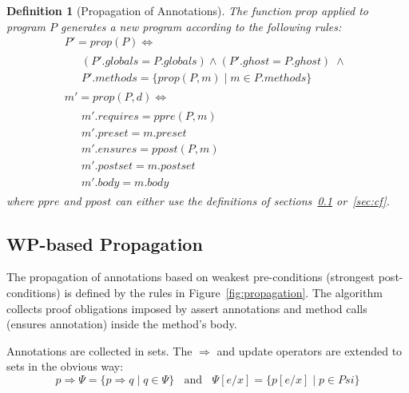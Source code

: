 \documentclass[10pt,notitlepage,twoside]{article}
\newcommand{\ppre}{\mathit{ppre}}
\newcommand{\ppost}{\mathit{ppost}}
\newtheorem{definition}{Definition}
\begin{document}
\begin{definition}[Propagation of Annotations]
The function $\mathit{prop}$ applied to program $P$ generates a new program  according to the following rules:
\begin{displaymath}
\begin{array}{l}
P' = \mathit{prop}(P) \Leftrightarrow \\
\;\;\;\;
\begin{array}{l}
(P'.\mathit{globals} = P.\mathit{globals}) \wedge (P'.\mathit{ghost} = P.\mathit{ghost}) \;\wedge \\
P'.\mathit{methods} = \{ \mathit{prop}(P,m) \mid m \in P.\mathit{methods}  \}
\end{array} \\
m' = \mathit{prop}(P,d)  \Leftrightarrow \\
\;\;\;\;
\begin{array}{l}
m'.\mathit{requires} = \ppre(P,m)  \\
m'.\mathit{preset} = m.\mathit{preset} \\
m'.\mathit{ensures} = \ppost(P,m)  \\
m'.\mathit{postset} = m.\mathit{postset} \\
m'.\mathit{body} = m.\mathit{body}
\end{array}
\end{array}
\end{displaymath}
where $\ppre$ and $\ppost$ can either use the definitions of sections~\ref{sec:wp} or~\ref{sec:cf}. 
\end{definition}

\subsection{WP-based Propagation}\label{sec:wp}

The propagation of annotations based on weakest pre-conditions (strongest post-conditions) is defined  by the rules in Figure~\ref{fig:propagation}. The algorithm collects proof obligations imposed by assert annotations and method calls (ensures annotation) inside the method's body.

Annotations are collected in sets. The $\Rightarrow$ and update operators are extended to sets in the obvious way:
\begin{displaymath}
p \Rightarrow \Psi = \{ p \Rightarrow q \mid q \in \Psi \}
\;\;\mbox{ and }\;\;
\Psi[e/x] = \{ p[e/x] \mid p \in Psi \}
\end{displaymath}
\end{document}
